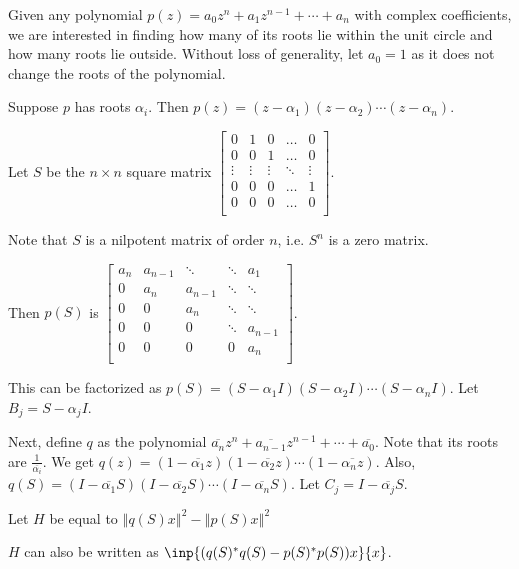 \documentclass[twofold]{article}
\newcommand*\conj[1]{\overline{#1}}
\newcommand*\adj[1]{#1^*}
\newcommand*\norm[1]{\left \Vert #1 \right\Vert}
\theoremstyle{plain}
\theoremstyle{definition}
\begin{document}
Given any polynomial \(p(z) = a_0 z^n + a_1z^{n-1} + \cdots + a_n\) with complex coefficients, we are interested in finding how many of its roots lie within the unit circle and how many roots lie outside. Without loss of generality, let \(a_0 = 1\) as it does not change the roots of the polynomial. 

Suppose \(p\) has roots \(\alpha_i\). Then \(p(z) = (z - \alpha_1) (z - \alpha_2) \cdots (z - \alpha_n)\). 

Let \(S\) be the \(n \times n\) square matrix \( \begin{bmatrix} 
0 & 1 & 0 & \ldots & 0 \\
0 & 0 & 1 & \ldots & 0 \\
\vdots & \vdots & \vdots &\ddots & \vdots \\
0 & 0 & 0 &\ldots & 1 \\
0 & 0 & 0 & \ldots & 0 \\ 
\end{bmatrix}\). 

 Note that \(S\) is a nilpotent matrix of order \(n\), i.e. \(S^n\) is a zero matrix.



 Then \(p(S) \) is \( \begin{bmatrix} 

a_n & a_{n-1} & \ddots & \ddots & a_1 \\
0 & a_n & a_{n-1} & \ddots & \ddots \\
0 & 0 & a_n & \ddots & \ddots \\
0 & 0 & 0 &\ddots & a_{n-1} \\
0 & 0 & 0 & 0 & a_n \\ 
\end{bmatrix}\). 


This can be factorized as \(p(S) = (S - \alpha_1I) (S - \alpha_2 I) \cdots (S - \alpha_n I)\). Let \(B_j = S - \alpha_jI\).

Next, define \(q\) as the polynomial \(\conj{a_n}z^n + \conj{a_{n-1}}z^{n-1} + \cdots + \conj{a_0}\). Note that its roots are \(\frac {1}{\conj{\alpha_i}}\). We get \(q(z) = (1 - \conj{\alpha_1}z) (1 - \conj{\alpha_2}z) \cdots (1 - \conj{\alpha_nz})\). Also, \(q(S) = (I - \conj{\alpha_1}S) (I - \conj{\alpha_2}S) \cdots (I - \conj{\alpha_n}S)\). Let \(C_j= I -  \conj{\alpha_j} S\).


Let \(H\) be equal to \(\norm{ q(S) x }^2 - \norm{ p(S) x}^2\)

\(H\) can also be written as \(\inp{(\adj{q(S)} q(S) - \adj{p(S)} p(S))x}{ x}\).
\end{document}
